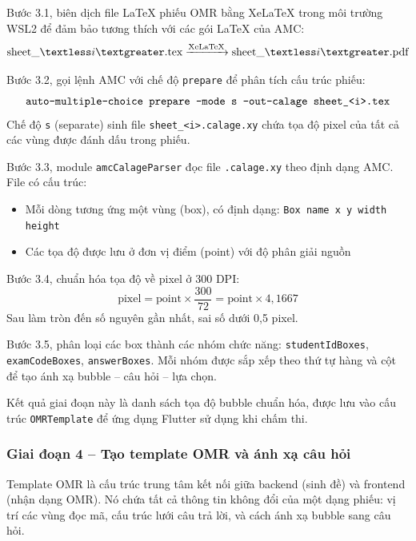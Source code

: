 ﻿\documentclass[../DoAn.tex]{subfiles}
\begin{document}
Bước 3.1, biên dịch file LaTeX phiếu OMR bằng XeLaTeX trong môi trường WSL2 để đảm bảo tương thích với các gói LaTeX của AMC:
\begin{equation}
    \text{sheet\_}\textless i\textgreater.\text{tex} \xrightarrow{\text{XeLaTeX}} \text{sheet\_}\textless i\textgreater.\text{pdf}
\end{equation}

Bước 3.2, gọi lệnh AMC với chế độ \texttt{prepare} để phân tích cấu trúc phiếu:
\begin{equation}
    \texttt{auto-multiple-choice prepare --mode s --out-calage sheet\_\textless i\textgreater.tex}
\end{equation}
Chế độ \texttt{s} (separate) sinh file \texttt{sheet\_\textless i\textgreater.calage.xy} chứa tọa độ pixel của tất cả các vùng được đánh dấu trong phiếu.

Bước 3.3, module \texttt{amcCalageParser} đọc file \texttt{.calage.xy} theo định dạng AMC. File có cấu trúc:
\begin{itemize}
  \item Mỗi dòng tương ứng một vùng (box), có định dạng: \texttt{Box name x y width height}
  \item Các tọa độ được lưu ở đơn vị điểm (point) với độ phân giải nguồn
\end{itemize}

Bước 3.4, chuẩn hóa tọa độ về pixel ở 300 DPI:
\begin{equation}
    \text{pixel} = \text{point} \times \frac{300}{72} = \text{point} \times 4{,}1667
\end{equation}
Sau làm tròn đến số nguyên gần nhất, sai số dưới 0,5 pixel.

Bước 3.5, phân loại các box thành các nhóm chức năng: \texttt{studentIdBoxes}, \texttt{examCodeBoxes}, \texttt{answerBoxes}. Mỗi nhóm được sắp xếp theo thứ tự hàng và cột để tạo ánh xạ bubble -- câu hỏi -- lựa chọn.

Kết quả giai đoạn này là danh sách tọa độ bubble chuẩn hóa, được lưu vào cấu trúc \texttt{OMRTemplate} để ứng dụng Flutter sử dụng khi chấm thi.

\subsubsection{Giai đoạn 4 -- Tạo template OMR và ánh xạ câu hỏi}
Template OMR là cấu trúc trung tâm kết nối giữa backend (sinh đề) và frontend (nhận dạng OMR). Nó chứa tất cả thông tin không đổi của một dạng phiếu: vị trí các vùng đọc mã, cấu trúc lưới câu trả lời, và cách ánh xạ bubble sang câu hỏi.
\end{document}
